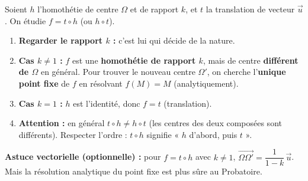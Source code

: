 \documentclass[11pt]{article}
\begin{document}
\begin{methode}
Soient $h$ l'homothétie de centre $\Omega$ et de rapport $k$, et $t$ la translation de vecteur $\vec{u}$. On étudie $f = t \circ h$ (ou $h \circ t$).
\begin{enumerate}
\item \textbf{Regarder le rapport $k$ :} c'est lui qui décide de la nature.
\item \textbf{Cas $k \neq 1$ :} $f$ est une \textbf{homothétie de rapport $k$}, mais de centre \textbf{différent de $\Omega$} en général. Pour trouver le nouveau centre $\Omega'$, on cherche l'\textbf{unique point fixe} de $f$ en résolvant $f(M) = M$ (analytiquement).
\item \textbf{Cas $k = 1$ :} $h$ est l'identité, donc $f = t$ (translation).
\item \textbf{Attention :} en général $t \circ h \neq h \circ t$ (les centres des deux composées sont différents). Respecter l'ordre : $t \circ h$ signifie « $h$ d'abord, puis $t$ ».
\end{enumerate}
\textbf{Astuce vectorielle (optionnelle) :} pour $f = t \circ h$ avec $k \neq 1$, $\overrightarrow{\Omega \Omega'} = \dfrac{1}{1-k}\,\vec{u}$. Mais la résolution analytique du point fixe est plus sûre au Probatoire.
\end{methode}
\end{document}
